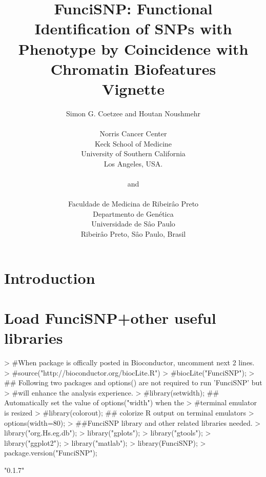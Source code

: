 \documentclass[a4paper]{article}
\begin{document}
\title{FunciSNP: Functional Identification of SNPs with\\Phenotype by 
Coincidence with Chromatin Biofeatures\\Vignette}
\author{Simon G. Coetzee and Houtan Noushmehr\\\\Norris Cancer Center\\Keck 
School of Medicine\\University of Southern California\\Los Angeles, USA.\\\\
and\\\\Faculdade de Medicina de Ribeir\^{a}o Preto\\Departmento de 
Gen\'{e}tica\\Universidade de S\^{a}o Paulo\\Ribeir\^{a}o Preto, S\^{a}o Paulo, 
Brasil}

\maketitle
\section*{Introduction}

\section*{Load FunciSNP+other useful libraries}
\begin{Schunk}
\begin{Sinput}
> #When package is offically posted in Bioconductor, uncomment next 2 lines.
> #source("http://bioconductor.org/biocLite.R")
> #biocLite("FunciSNP");
> ## Following two packages and options() are not required to run 'FunciSNP' but 
> #will enhance the analysis experience.
> #library(setwidth); ## Automatically set the value of options("width") when the 
> #terminal emulator is resized
> #library(colorout); ## colorize R output on terminal emulators
> options(width=80);
> ##FunciSNP library and other related libraries needed.
> library("org.Hs.eg.db");
> library("gplots");
> library("gtools");
> library("ggplot2");
> library("matlab");
> library(FunciSNP);
> package.version("FunciSNP");
\end{Sinput}
\begin{Soutput}
[1] "0.1.7"
\end{Soutput}
\end{Schunk}
\end{document}
